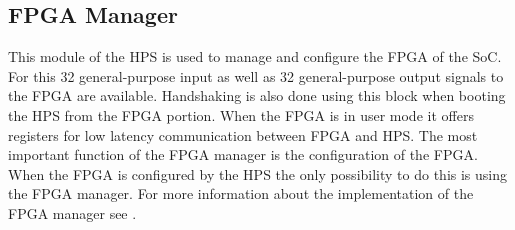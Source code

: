\subsection{FPGA Manager}
This module of the HPS is used to manage and configure the FPGA of the SoC. For this 32 general-purpose input as well as 32 general-purpose output signals to the FPGA are available. Handshaking is also done using this block when booting the HPS from the FPGA portion. When the FPGA is in user mode it offers registers for low latency communication between FPGA and HPS. The most important function of the FPGA manager is the configuration of the FPGA. When the FPGA is configured by the HPS the only possibility to do this is using the FPGA manager.
For more information about the implementation of the FPGA manager see \cite[chapter 5]{AlteraHPS15}.
